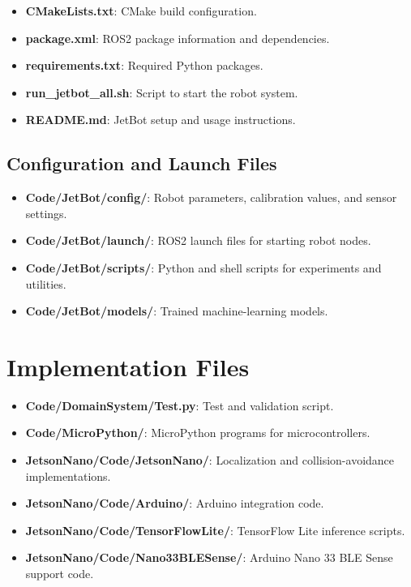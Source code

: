 \begin{itemize}
	\item \textbf{CMakeLists.txt}: CMake build configuration.
	\item \textbf{package.xml}: ROS2 package information and dependencies.
	\item \textbf{requirements.txt}: Required Python packages.
	\item \textbf{run\_jetbot\_all.sh}: Script to start the robot system.
	\item \textbf{README.md}: JetBot setup and usage instructions.
\end{itemize}

\subsection{Configuration and Launch Files}

\begin{itemize}
	\item \textbf{Code/JetBot/config/}: Robot parameters, calibration values, and sensor settings.
	\item \textbf{Code/JetBot/launch/}: ROS2 launch files for starting robot nodes.
	\item \textbf{Code/JetBot/scripts/}: Python and shell scripts for experiments and utilities.
	\item \textbf{Code/JetBot/models/}: Trained machine-learning models.
\end{itemize}

\section{Implementation Files}

\begin{itemize}
	\item \textbf{Code/DomainSystem/Test.py}: Test and validation script.
	\item \textbf{Code/MicroPython/}: MicroPython programs for microcontrollers.
	\item \textbf{JetsonNano/Code/JetsonNano/}: Localization and collision-avoidance implementations.
	\item \textbf{JetsonNano/Code/Arduino/}: Arduino integration code.
	\item \textbf{JetsonNano/Code/TensorFlowLite/}: TensorFlow Lite inference scripts.
	\item \textbf{JetsonNano/Code/Nano33BLESense/}: Arduino Nano 33 BLE Sense support code.
\end{itemize}

